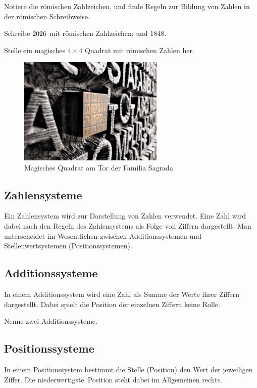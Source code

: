 \documentclass[%
11pt,%
twoside,%
titlepage,%
german,%
]{scrartcl}
\begin{document}
\begin{ueb}[römisch]
Notiere die r\"omischen Zahlzeichen, und finde Regeln zur Bildung von Zahlen in der r\"omischen Schreibweise.
\end{ueb}
\begin{ueb}[Jahreszahl]
Schreibe $\the\year$ mit r\"omischen Zahlzeichen; und $1848$.
\end{ueb}
\begin{ueb}
Stelle ein magisches $4\times4$ Quadrat mit r\"omischen Zahlen her.
\end{ueb}

\begin{figure}
\begin{center}
\includegraphics[width=0.618\textwidth]{pictures/magquadr}
\end{center}
\caption{Magisches Quadrat am Tor der Familia Sagrada}
\end{figure}

\subsection{Zahlensysteme}
Ein Zahlensystem wird zur Darstellung von Zahlen verwendet. Eine Zahl wird dabei nach den Regeln des Zahlensystems als Folge von Ziffern dargestellt. Man unterscheidet im Wesentlichen zwischen Additionssystemen und Stellenwertsystemen (Positionssystemen).
\subsection{Additionssysteme}
In einem Additionssystem wird eine Zahl als Summe der Werte ihrer Ziffern dargestellt. Dabei spielt die Position der einzelnen Ziffern keine Rolle.
\begin{ueb}
Nenne zwei Additionssysteme.
\end{ueb}
\subsection{Positionssysteme}
In einem Positionssystem bestimmt die Stelle (Position) den Wert der jeweiligen Ziffer. Die \glqq niederwertigste\grqq\ Position steht dabei im Allgemeinen rechts.
\end{document}
